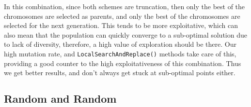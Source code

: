 \documentclass{article}
\theoremstyle{mytheoremstyle}
\theoremstyle{mytheoremstyle}
\theoremstyle{myproblemstyle}
\begin{document}
In this combination, since both schemes are truncation, then only the best of the chromosomes are selected as parents, and only the best of the chromosomes are selected for the next generation. This tends to be more exploitative, which can also mean that the population can quickly converge to a sub-optimal solution due to lack of diversity, therefore, a high value of exploration should be there. Our high mutation rate, and \texttt{LocalSearchAndReplace()} methods take care of this, providing a good counter to the high exploitativeness of this combination. Thus we get better results, and don't always get stuck at sub-optimal points either.

\subsection{Random and Random}
\end{document}
